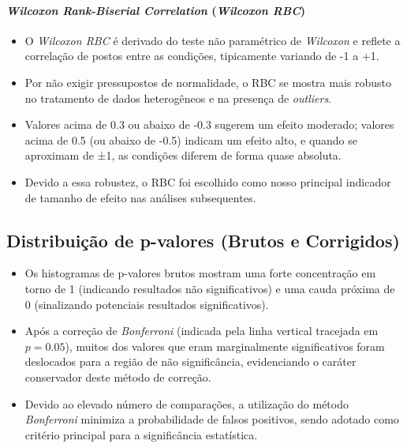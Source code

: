 \paragraph{\textit{Wilcoxon Rank-Biserial Correlation} (\textit{Wilcoxon RBC})}
\begin{itemize}
    \item O \textit{Wilcoxon RBC} é derivado do teste não paramétrico de \textit{Wilcoxon} e reflete a correlação de postos entre as condições, tipicamente variando de -1 a +1.
    \item Por não exigir pressupostos de normalidade, o RBC se mostra mais robusto no tratamento de dados heterogêneos e na presença de \textit{outliers}.
    \item Valores acima de 0.3 ou abaixo de -0.3 sugerem um efeito moderado; valores acima de 0.5 (ou abaixo de -0.5) indicam um efeito alto, e quando se aproximam de ±1, as condições diferem de forma quase absoluta.
    \item Devido a essa robustez, o RBC foi escolhido como nosso principal indicador de tamanho de efeito nas análises subsequentes.
\end{itemize}

\subsection{Distribuição de p-valores (Brutos e Corrigidos)}
\begin{itemize}
    \item Os histogramas de p-valores brutos mostram uma forte concentração em torno de 1 (indicando resultados não significativos) e uma cauda próxima de 0 (sinalizando potenciais resultados significativos).
    \item Após a correção de \textit{Bonferroni} (indicada pela linha vertical tracejada em \(p=0.05\)), muitos dos valores que eram marginalmente significativos foram deslocados para a região de não significância, evidenciando o caráter conservador deste método de correção.
    \item Devido ao elevado número de comparações, a utilização do método \textit{Bonferroni} minimiza a probabilidade de falsos positivos, sendo adotado como critério principal para a significância estatística.
\end{itemize}

